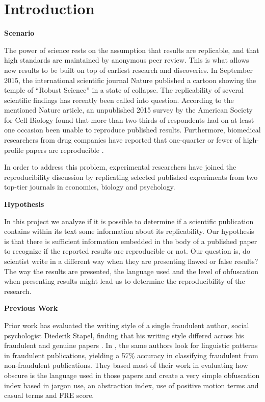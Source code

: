 \documentclass[12pt]{article}
\begin{document}
\section{Introduction}
\quad \textbf{Scenario} 

The power of science rests on the assumption that results are replicable, and that high standards are maintained by anonymous peer review. This is what allows new results to be built on top of earliest research and discoveries. In September 2015, the international scientific journal Nature \cite{nature1} published a cartoon showing the temple of “Robust Science” in a state of collapse. 
The replicability of several scientific findings has recently been called into question. According to the mentioned Nature article,  an unpublished 2015 survey by the American Society for Cell Biology found that more than two-thirds of respondents had on at least one occasion been unable to reproduce published results. Furthermore, biomedical researchers from drug companies have reported that one-quarter or fewer of high-profile papers are reproducible \cite{begley, prinz}.

In order to address this problem, experimental researchers have joined the reproducibility discussion by replicating selected published experiments from two top-tier journals in economics, biology and psychology.

\textbf{Hypothesis}

In this project we analyze if it is possible to determine if a scientific publication contains within its text some information about its replicability. Our hypothesis is that there is sufficient information embedded in the body of a published paper to recognize if the reported results are reproducible or not. Our question is, do scientist write in a different way when they are presenting flawed or false results? The way the results are presented, the language used and the level of obfuscation when presenting results might lead us to determine the reproducibility of the research.


\textbf{Previous Work}

Prior work has evaluated the writing style of a single fraudulent author, social psychologist Diederik Stapel, finding that his writing style differed across his fraudulent and genuine papers \cite{prev}. In \cite{prev2}, the same authors look for linguistic patterns in fraudulent publications, yielding a 57\% accuracy in classifying fraudulent from non-fraudulent publications. They based most of their work in evaluating how obscure is the language used in those papers and create a very simple obfuscation index based in jargon use, an abstraction index, use of positive motion terms and casual terms and FRE score.
\end{document}
